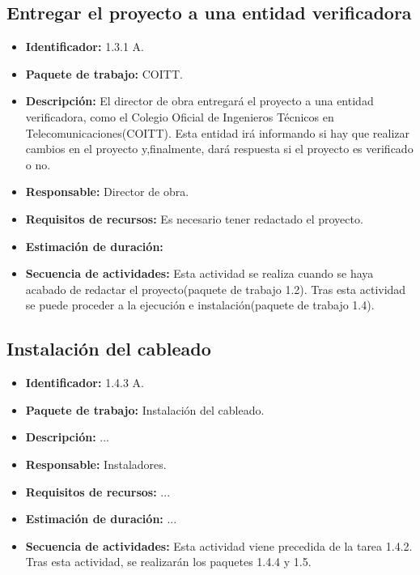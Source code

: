 \subsection{Entregar el proyecto a una entidad verificadora}
\begin{itemize}
\item \textbf{Identificador: }1.3.1 A.
\item \textbf{Paquete de trabajo: }COITT.
\item \textbf{Descripción: }El director de obra entregará el proyecto a una entidad verificadora, como el  Colegio Oficial de Ingenieros Técnicos en Telecomunicaciones(COITT). Esta entidad irá informando si hay que realizar cambios en el proyecto y,finalmente, dará respuesta si el proyecto es verificado o no.
\item \textbf{Responsable: }Director de obra.
\item \textbf{Requisitos de recursos: }Es necesario tener redactado el proyecto.
\item \textbf{Estimación de duración: }
\item \textbf{Secuencia de actividades: }Esta actividad se realiza cuando se haya acabado de redactar el proyecto(paquete de trabajo 1.2). Tras esta actividad se puede proceder a la ejecución e instalación(paquete de trabajo 1.4).
\end{itemize}

\subsection{Instalación del cableado}
\begin{itemize}
\item \textbf{Identificador: }1.4.3 A.
\item \textbf{Paquete de trabajo: }Instalación del cableado.
\item \textbf{Descripción: }...
\item \textbf{Responsable: }Instaladores.
\item \textbf{Requisitos de recursos: }... 
\item \textbf{Estimación de duración: }...
\item \textbf{Secuencia de actividades: }Esta actividad viene precedida de la tarea 1.4.2. Tras esta actividad, se realizarán los paquetes 1.4.4 y 1.5.
\end{itemize}

